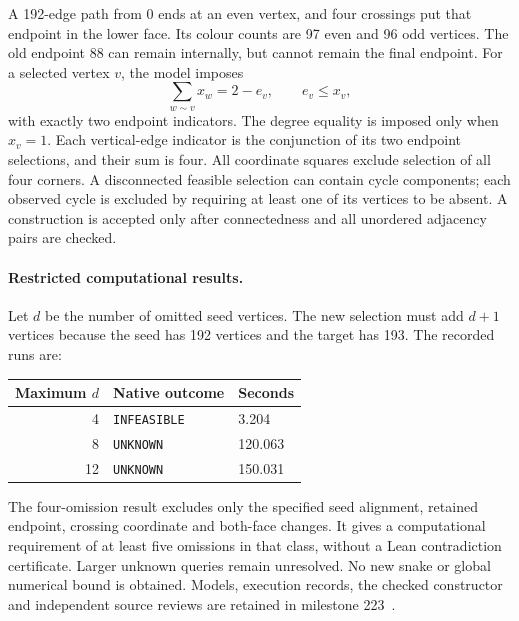 \documentclass[11pt,a4paper]{article}
\theoremstyle{definition}
\theoremstyle{remark}
\begin{document}
A 192-edge path from 0 ends at an even vertex, and four crossings put
that endpoint in the lower face. Its colour counts are 97 even and
96 odd vertices. The old endpoint 88 can remain internally, but cannot
remain the final endpoint. For a selected vertex $v$, the model imposes
\[
\sum_{w\sim v}x_w=2-e_v,\qquad e_v\le x_v,
\]
with exactly two endpoint indicators. The degree equality is imposed
only when $x_v=1$. Each vertical-edge indicator is the conjunction of
its two endpoint selections, and their sum is four. All coordinate
squares exclude selection of all four corners. A disconnected feasible
selection can contain cycle components; each observed cycle is excluded
by requiring at least one of its vertices to be absent. A construction
is accepted only after connectedness and all unordered adjacency pairs
are checked.

\paragraph{Restricted computational results.}
Let $d$ be the number of omitted seed vertices. The new selection must
add $d+1$ vertices because the seed has 192 vertices and the target has
193. The recorded runs are:
\begin{center}
\begin{tabular}{rll}
Maximum $d$ & Native outcome & Seconds\\\hline
4 & \texttt{INFEASIBLE} & 3.204\\
8 & \texttt{UNKNOWN} & 120.063\\
12 & \texttt{UNKNOWN} & 150.031\\
\end{tabular}
\end{center}
The four-omission result excludes only the specified seed alignment,
retained endpoint, crossing coordinate and both-face changes. It gives
a computational requirement of at least five omissions in that class,
without a Lean contradiction certificate. Larger unknown queries remain
unresolved. No new snake or global numerical bound is obtained.
Models, execution records, the checked constructor and independent
source reviews are retained in milestone 223~\cite{research223}.
\end{document}
